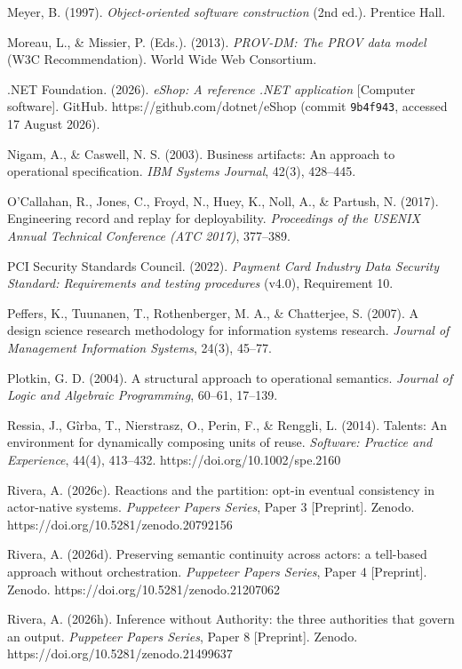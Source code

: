 \documentclass[
]{article}
\begin{document}
Meyer, B. (1997). \emph{Object-oriented software construction} (2nd
ed.). Prentice Hall.

Moreau, L., \& Missier, P. (Eds.). (2013). \emph{PROV-DM: The PROV data
model} (W3C Recommendation). World Wide Web Consortium.

.NET Foundation. (2026). \emph{eShop: A reference .NET application}
{[}Computer software{]}. GitHub. https://github.com/dotnet/eShop (commit
\texttt{9b4f943}, accessed 17 August 2026).

Nigam, A., \& Caswell, N. S. (2003). Business artifacts: An approach to
operational specification. \emph{IBM Systems Journal}, 42(3), 428--445.

O'Callahan, R., Jones, C., Froyd, N., Huey, K., Noll, A., \& Partush, N.
(2017). Engineering record and replay for deployability.
\emph{Proceedings of the USENIX Annual Technical Conference (ATC 2017)},
377--389.

PCI Security Standards Council. (2022). \emph{Payment Card Industry Data
Security Standard: Requirements and testing procedures} (v4.0),
Requirement 10.

Peffers, K., Tuunanen, T., Rothenberger, M. A., \& Chatterjee, S.
(2007). A design science research methodology for information systems
research. \emph{Journal of Management Information Systems}, 24(3),
45--77.

Plotkin, G. D. (2004). A structural approach to operational semantics.
\emph{Journal of Logic and Algebraic Programming}, 60--61, 17--139.

Ressia, J., Gîrba, T., Nierstrasz, O., Perin, F., \& Renggli, L. (2014).
Talents: An environment for dynamically composing units of reuse.
\emph{Software: Practice and Experience}, 44(4), 413--432.
https://doi.org/10.1002/spe.2160

Rivera, A. (2026c). Reactions and the partition: opt-in eventual
consistency in actor-native systems. \emph{Puppeteer Papers Series},
Paper 3 {[}Preprint{]}. Zenodo. https://doi.org/10.5281/zenodo.20792156

Rivera, A. (2026d). Preserving semantic continuity across actors: a
tell-based approach without orchestration. \emph{Puppeteer Papers
Series}, Paper 4 {[}Preprint{]}. Zenodo.
https://doi.org/10.5281/zenodo.21207062

Rivera, A. (2026h). Inference without Authority: the three authorities
that govern an output. \emph{Puppeteer Papers Series}, Paper 8
{[}Preprint{]}. Zenodo. https://doi.org/10.5281/zenodo.21499637
\end{document}
